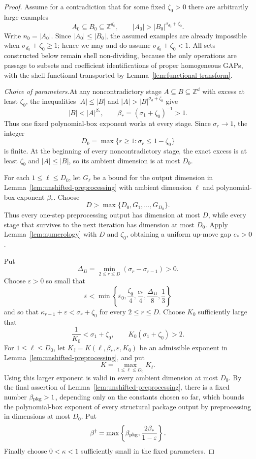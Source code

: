 \documentclass[11pt,reqno]{amsart}
\theoremstyle{definition}
\theoremstyle{remark}
\newcommand{\Z}{\mathbb Z}
\newcommand{\eps}{\varepsilon}
\begin{document}
\begin{proof}
Assume for a contradiction that for some fixed $\zeta_0>0$ there are
arbitrarily large examples
\[
 A_0\subseteq B_0\subseteq\Z^{d_0},
 \qquad
 |A_0|>|B_0|^{\sigma_{d_0}+\zeta_0}.
\]
Write $n_0=|A_0|$.  Since $|A_0|\le|B_0|$, the assumed examples are
already impossible when $\sigma_{d_0}+\zeta_0\ge1$; hence we may and do
assume $\sigma_{d_0}+\zeta_0<1$.  All sets constructed below remain shell
non-dividing, because the only operations are passage to subsets and
coefficient identifications of proper homogeneous GAPs, with the shell
functional transported by Lemma~\ref{lem:functional-transform}.

\medskip\noindent\emph{Choice of parameters.}\quad At any
noncontradictory stage $A\subseteq B\subseteq\Z^d$ with excess at least
$\zeta_0$, the inequalities $|A|\le|B|$ and
$|A|>|B|^{\sigma_d+\zeta_0}$ give
\[
 |B|<|A|^{\beta_*},
 \qquad
 \beta_*=(\sigma_1+\zeta_0)^{-1}>1.
\]
Thus one fixed polynomial-box exponent works at every stage.  Since
$\sigma_r\to1$, the integer
\[
 D_0=\max\{r\ge1:\sigma_r\le1-\zeta_0\}
\]
is finite.  At the beginning of every noncontradictory stage, the exact
excess is at least $\zeta_0$ and $|A|\le|B|$, so its ambient dimension is
at most $D_0$.

For each $1\le\ell\le D_0$, let $G_\ell$ be a bound for the output
dimension in Lemma~\ref{lem:unshifted-preprocessing} with ambient dimension
$\ell$ and polynomial-box exponent $\beta_*$.  Choose
\[
 D>\max\{D_0,G_1,\dots,G_{D_0}\}.
\]
Thus every one-step preprocessing output has dimension at most $D$, while
every stage that survives to the next iteration has dimension at most $D_0$.
Apply Lemma~\ref{lem:numerology} with $D$ and $\zeta_0$,
obtaining a uniform up-move gap $c_*>0$.

Put
\[
 \Delta_D=\min_{2\le r\le D}(\sigma_r-\sigma_{r-1})>0.
\]
Choose $\eps>0$ so small that
\[
 \eps<\min\left\{
  \eps_0,\frac{\zeta_0}{4},\frac{c_*}{4},
  \frac{\Delta_D}{8},\frac13
 \right\}
\]
and so that $\kappa_{r-1}+\eps<\sigma_r+\zeta_0$ for every
$2\le r\le D$.  Choose $K_0$ sufficiently large that
\[
 \frac1{K_0}<\sigma_1+\zeta_0,
 \qquad
 K_0(\sigma_1+\zeta_0)>2.
\]
For $1\le\ell\le D_0$, let
$K_\ell=K(\ell,\beta_*,\eps,K_0)$ be an admissible exponent in
Lemma~\ref{lem:unshifted-preprocessing}, and put
\[
 K=\max_{1\le\ell\le D_0}K_\ell.
\]
Using this larger exponent is valid in every ambient dimension at most
$D_0$.  By the final assertion of
Lemma~\ref{lem:unshifted-preprocessing}, there is a fixed number
$\beta_{\rm pkg}>1$, depending only on the constants chosen so far, which
bounds the polynomial-box exponent of every structural package output by
preprocessing in dimensions at most $D_0$.  Put
\[
 \beta^\dagger
 =\max\left\{\beta_{\rm pkg},
       \frac{2\beta_*}{1-\eps}\right\}.
\]
Finally choose $0<\kappa<1$ sufficiently small in the fixed parameters.


\end{proof}
\end{document}
